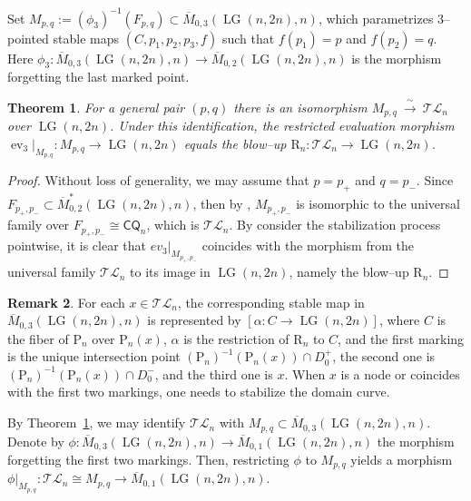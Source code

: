 \documentclass[10pt]{amsart}
\newtheorem{theorem}{Theorem}[section]
\theoremstyle{definition}
\newtheorem{remark}[theorem]{Remark}
\newcommand{\Mbar}{\overline{M}}
\newcommand{\LG}{\operatorname{LG}}
\newcommand{\CQ}{\mathsf{CQ}}
\newcommand{\ev}{\operatorname{ev}}
\newcommand{\TL}{\mathcal{TL}}
\newcommand{\RL}{\mathrm{R}}
\newcommand{\PL}{\mathrm{P}}
\theoremstyle{plain} %
\begin{document}


Set $M_{p,q}:=(\phi_3)^{-1}(F_{p,q})\subset \Mbar_{0,3}(\LG(n,2n),n)$, which parametrizes $3$--pointed stable maps $(C,p_1,p_2,p_3,f)$ such that $f(p_1)=p$ and $f(p_2)=q$. Here $\phi_3\colon \Mbar_{0,3}(\LG(n,2n),n)\rightarrow \Mbar_{0,2}(\LG(n,2n),n)$
is the morphism forgetting the last marked point. 


\begin{theorem}\label{thm:Mpq-is-TLn}
For a general pair $(p,q)$ there is an isomorphism $M_{p,q}\ \xrightarrow{\ \sim\ }\ \TL_n$ over $\LG(n,2n)$. Under this identification, the restricted evaluation morphism $\ev_3|_{M_{p,q}}\colon M_{p,q}\to \LG(n,2n)$ equals the blow--up
$\RL_n\colon \TL_n\to \LG(n,2n)$.
\end{theorem}
\begin{proof} Without loss of generality, we may assume that $p=p_+$ and $q=p_-$. Since $F_{p_+,p_-}\subset\Mbar^*_{0,2}(\LG(n,2n),n)$, then by \cite[Theorem 4.5 of Chapter V]{Man}, $M_{p_+,p_-}$ is isomorphic to the universal family over $F_{p_+,p_-}\cong\CQ_n$, which is $\TL_n$. By consider the stabilization process pointwise, it is clear that $ev_3|_{M_{p_+,p_-}}$ coincides with the morphism from the universal family $\TL_n$ to its image in $\LG(n,2n)$, namely the blow--up $\RL_n$. 
\end{proof}


\begin{remark}\label{geom03}
For each $x\in\TL_n$, the
corresponding stable map in $\overline{M}_{0,3}(\LG(n,2n),n)$ is represented by $[\alpha\colon C\rightarrow\LG(n,2n)]$, where $C$ is the fiber of $\PL_n$ over $\PL_n(x)$, $\alpha$ is the restriction of $\RL_n$ to $C$, and the first marking is the unique intersection point $(\PL_n)^{-1}(\PL_n(x))\cap D^+_0$, the second one is $(\PL_n)^{-1}(\PL_n(x))\cap D^-_0$, and the third one is $x$. When $x$ is a node or coincides with the first two markings, one needs to stabilize the domain curve.    
\end{remark}

By Theorem~\ref{thm:Mpq-is-TLn}, we may identify $\TL_n$ with $M_{p,q}\subset \Mbar_{0,3}(\LG(n,2n),n)$. Denote by $\phi\colon\Mbar_{0,3}(\LG(n,2n),n)\rightarrow\Mbar_{0,1}(\LG(n,2n),n)$ the morphism forgetting the first two markings. Then, restricting $\phi$ to $M_{p,q}$ yields a morphism 
$\phi|_{M_{p,q}}\colon \TL_n\cong M_{p,q}\longrightarrow \Mbar_{0,1}(\LG(n,2n),n)$.
\end{document}
